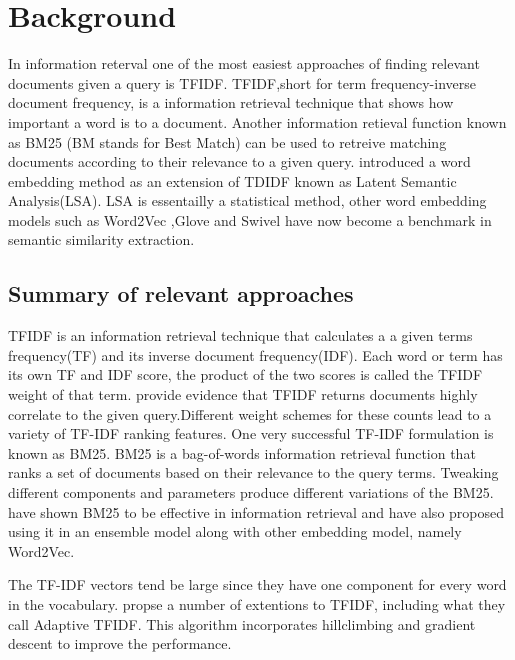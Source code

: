 \chapter{Background} 
\label{chapter:background}

In information reterval one of the most easiest approaches of finding relevant documents given a query is TFIDF.
TFIDF,short for term frequency-inverse document frequency, is a information retrieval technique that shows how important a word is to a document. Another information retieval function known as BM25 (BM stands for Best Match) \cite{robertson2009probabilistic}can be used to retreive matching documents according to their relevance to a given query.\cite{dumais2004latent} introduced a word embedding method as an extension of TDIDF known as Latent Semantic Analysis(LSA). LSA is essentailly a statistical method, other word embedding models such as  Word2Vec \cite{mikolov2013efficient}  ,Glove \cite{pennington2014glove} and Swivel \cite{shazeer2016swivel} have now become a benchmark in semantic similarity extraction.


\section{Summary of relevant approaches}
TFIDF is an information retrieval technique that calculates a a given terms frequency(TF) and its inverse document frequency(IDF). Each word or term has its own TF and IDF score, the product of the two scores is called the TFIDF weight of that term.\cite{ramos2003using} provide evidence that TFIDF returns
documents highly correlate to the given query.Different weight schemes for these counts lead to a variety of TF-IDF ranking features. One very successful TF-IDF
formulation is known as BM25\cite{robertson2009probabilistic}.
BM25  is a bag-of-words information retrieval function that ranks a set of documents based on their relevance to the query terms. Tweaking different components and parameters produce different variations of the BM25. \cite{mitra2016dual} have shown BM25 to be effective in information retrieval and have also proposed using it in an ensemble model along with other embedding model, namely Word2Vec.

The TF-IDF vectors tend be large since they have one component for every word in the vocabulary. \cite{berger2000bridging} propse a number of extentions to TFIDF, including what they call Adaptive TFIDF. This algorithm incorporates hillclimbing and gradient descent to improve the performance.

